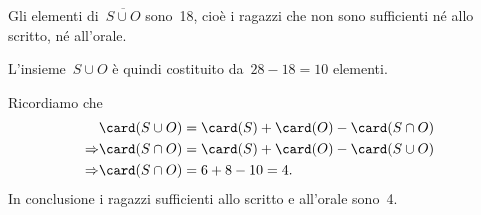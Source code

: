 \begin{exrig}
\begin{esempio}
\begin{multicols}{2}
Gli elementi di~$\overline{S\cup O}$ sono~18, cioè i ragazzi che
non sono sufficienti né allo scritto, né all'orale.
\begin{center}
 
\end{center}
\end{multicols}

L'insieme~$S\cup O$ è quindi costituito da~$28-18=10$ elementi.

Ricordiamo che
\begin{align*}
 &\card(S\cup O)=\card(S)+\card(O)-\card(S\cap O)\\
 \Rightarrow &\card(S\cap O)=\card(S)+\card(O)-\card(S\cup O)\\
 \Rightarrow &\card(S\cap O)=6+8-10=4.
\end{align*}
In conclusione i ragazzi sufficienti allo scritto e all'orale sono~4.
\end{esempio}
\end{exrig}

\ovalbox{\risolvii \ref{ese:7.25}, \ref{ese:7.26}, \ref{ese:7.27}, \ref{ese:7.28}, \ref{ese:7.29}, \ref{ese:7.30}, \ref{ese:7.31}, \ref{ese:7.32}, \ref{ese:7.33}, \ref{ese:7.34},
\ref{ese:7.35}, \ref{ese:7.36}, \ref{ese:7.37}}

\vspazio\ovalbox{\ref{ese:7.38}}
\newpage
 
\cleardoublepage

